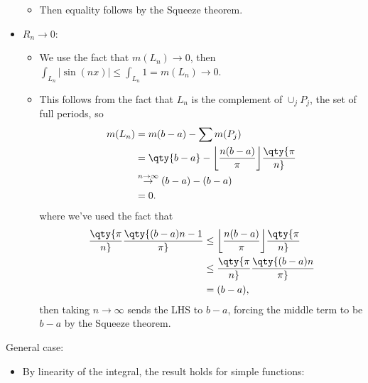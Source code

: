 \begin{solution}
\begin{itemize}
  \begin{itemize}
  \tightlist
  \item
    Then equality follows by the Squeeze theorem.
  \end{itemize}
\item
  \(R_n \to 0\):

  \begin{itemize}
  \tightlist
  \item
    We use the fact that \(m(L_n) \to 0\), then
    \(\int_{L_n} {\left\lvert {\sin(nx)} \right\rvert} \leq \int_{L_n} 1 = m(L_n) \to 0\).
  \item
    This follows from the fact that \(L_n\) is the complement of
    \(\cup_j P_j\), the set of full periods, so
    \begin{align*}  
    m(L_n) 
    &= m(b-a) - \sum m(P_j) \\
    &= \qty{b-a} -  {\left\lfloor n(b-a) \over \pi \right\rfloor}\qty{\pi \over n} \\
    &\overset{n\to \infty}\to (b-a) - (b-a) \\
    &= 0
    .\end{align*}
    where we've used the fact that
    \begin{align*}  
    \qty{\pi \over n} \qty{(b-a)n-1 \over \pi} 
    &\leq {\left\lfloor n(b-a) \over \pi \right\rfloor}\qty{\pi \over n}  \\
    &\leq \qty{\pi \over n} \qty{(b-a)n\over \pi}  \\
    &= (b-a)
    ,\end{align*}
    then taking \(n\to \infty\) sends the LHS to \(b-a\), forcing the
    middle term to be \(b-a\) by the Squeeze theorem.
  \end{itemize}
\end{itemize}

General case:

\begin{itemize}
\item
  By linearity of the integral, the result holds for simple functions:


\end{itemize}
\end{solution}
